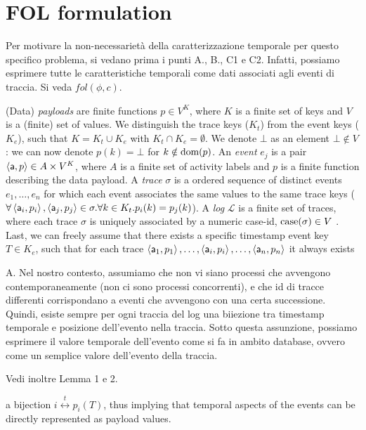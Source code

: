 \section{FOL formulation}
\begin{UnknownEnvironment}
	\color{red} Per motivare la non-necessarietà della caratterizzazione temporale per questo specifico problema, si vedano prima i punti A., B., C1 e C2. Infatti, possiamo esprimere tutte le caratteristiche temporali come dati associati agli eventi di traccia. Si veda $fol(\phi,c)$.
\end{UnknownEnvironment}
(Data) \emph{payloads} are finite functions $p\in V^K$, where $K$ is a finite set of keys and $V$ is a (finite) set of values. We distinguish the trace keys ($K_t$) from the event keys ($K_e$), such that $K=K_t\cup K_e$ with $K_t\cap K_e=\emptyset$. We denote $\bot$ as an element $\bot\notin V$: we can now denote $p(k)=\bot$ for $k\notin\textup{dom}(p)$.  An \emph{event} $e_j$ is a pair $\Braket{\mathsf{a},p}\in A\times V^K$, where $A$ is a finite set of activity labels and $p$ is a finite function describing the data payload. A \emph{trace} $\sigma$ is a ordered sequence of distinct events $e_1,\dots,e_n$ for which each event associates the same values to the same trace keys ($\forall \Braket{\mathsf{a}_i,p_i},\Braket{\mathsf{a}_j,p_j}\in \sigma.\forall k\in K_t. p_i(k)=p_j(k)$). A \emph{log} $\mathcal{L}$ is a finite set of {traces}, where each trace $\sigma$ is uniquely associated by a numeric case-id, $\textup{case}(\sigma)\in V$ . Last, we can freely assume that there exists a specific timestamp event key $T\in K_e$, such that for each trace $\Braket{\mathsf{a}_1,p_1},\dots,\Braket{\mathsf{a}_i,p_i},\dots,\Braket{\mathsf{a}_n,p_n}$ it always exists
\begin{UnknownEnvironment}
	\color{red}A. Nel nostro contesto, assumiamo che non vi siano processi che avvengono contemporaneamente (non ci sono processi concorrenti), e che id di tracce differenti corrispondano a eventi che avvengono con una certa successione. Quindi, esiste sempre per ogni traccia del log una biiezione tra timestamp temporale e posizione dell'evento nella traccia. Sotto questa assunzione, possiamo esprimere il valore temporale dell'evento come si fa in ambito database, ovvero come un semplice valore dell'evento della traccia. 
	
	Vedi inoltre  Lemma 1 e 2.
\end{UnknownEnvironment}
 a bijection $i\overset{t}{\leftrightarrow} p_i(T)$, thus implying that temporal aspects of the events can be directly represented as payload values.

